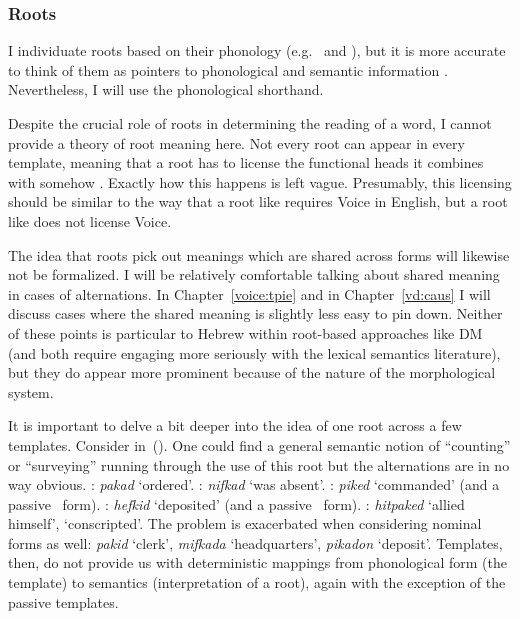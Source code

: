 		\subsubsection{Roots}
I individuate roots based on their phonology (e.g.~ and ), but it is more accurate to think of them as pointers to phonological and semantic information \citep{harley14thlia,faust16,kastner18nllt}. Nevertheless, I will use the phonological shorthand.

Despite the crucial role of roots in determining the reading of a word, I cannot provide a theory of root meaning here. Not every root can appear in every template, meaning that a root has to license the functional heads it combines with somehow \citep{harleynoyer00}. Exactly how this happens is left vague. Presumably, this licensing should be similar to the way that a root like  requires Voice in English, but a root like  does not license Voice.

The idea that roots pick out meanings which are shared across forms will likewise not be formalized. I will be relatively comfortable talking about shared meaning in cases of alternations. In Chapter~\ref{voice:tpie} and in Chapter~\ref{vd:caus} I will discuss cases where the shared meaning is slightly less easy to pin down. Neither of these points is particular to Hebrew within root-based approaches like DM (and both require engaging more seriously with the lexical semantics literature), but they do appear more prominent because of the nature of the morphological system.

It is important to delve a bit deeper into the idea of one root across a few templates. Consider  in~(\nextx).  One could find a general semantic notion of ``counting'' or ``surveying'' running through the use of this root but the alternations are in no way obvious. 
\pex\label{ex:naive-pkd}
  \a \tkal: \emph{pakad} `ordered'.
  \a \tnif: \emph{nifkad} `was absent'.
  \a \tpie: \emph{piked} `commanded' (and a passive \tpua~form).
  \a \thif: \emph{hefkid} `deposited' (and a passive \thuf~form).
  \a \thit: \emph{hitpaked} `allied himself', `conscripted'.
\xe
The problem is exacerbated when considering nominal forms as well: \emph{pakid} `clerk', \emph{mifkada} `headquarters', \emph{pikadon} `deposit'. Templates, then, do not provide us with deterministic mappings from phonological form (the template) to semantics (interpretation of a root), again with the exception of the passive templates.

